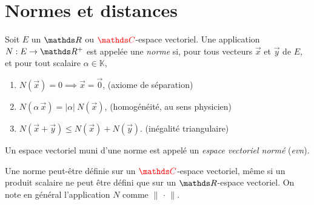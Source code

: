 \section{Normes et distances}

\begin{defn}
	Soit $E$\/ un $\R$ ou $\red\C$-espace vectoriel. Une application $N : E \to \R^+$\/ est appelée une \textit{norme} si, pour tous vecteurs $\vec{x}$\/ et $\vec{y}$\/ de $E$, et pour tout scalaire $\alpha \in \mathds{K}$,\footnotemark
	\begin{enumerate}
		\item $N(\vec{x}) = 0 \implies \vec{x} = \vec{0}$, \hfill (axiome de séparation)
		\item $N(\alpha\,\vec{x}) = |\alpha|\:N(\vec{x})$, \hfill (homogénéité, au sens physicien)
		\item $N(\vec{x} + \vec{y}) \le N(\vec{x}) + N(\vec{y})$. \hfill (inégalité triangulaire)
	\end{enumerate}
	Un espace vectoriel muni d'une norme est appelé un \textit{espace vectoriel normé} (\textit{evn}).
\end{defn}

Une norme peut-être définie sur un $\red \C$-espace vectoriel, même si un produit scalaire ne peut être défini que sur un $\R$-espace vectoriel.
On note en général l'application $N$\/ comme $\|\,\cdot\,\|$.

